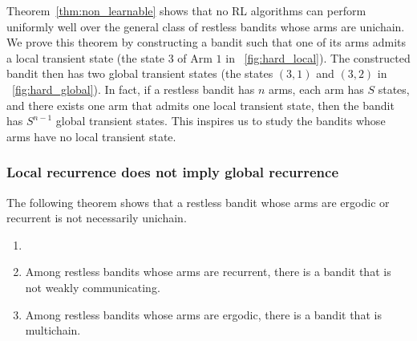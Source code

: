 Theorem~\ref{thm:non_learnable} shows that no RL algorithms can perform uniformly well over the general class of restless bandits whose arms are unichain. %
We prove this theorem by constructing a bandit such that one of its arms admits a local transient state (the state $3$ of Arm $1$ in \figurename~\ref{fig:hard_local}).
The constructed bandit then has two global transient states (the states $(3,1)$ and $(3,2)$ in \figurename~\ref{fig:hard_global}).
In fact, if a restless bandit has $n$ arms, each arm has $S$ states, and there exists one arm that admits one local transient state, then the bandit has $S^{n-1}$ global transient states.
This inspires us to study the bandits whose arms have no local transient state.

\subsubsection{Local recurrence does not imply global recurrence}

The following theorem shows that a restless bandit whose arms are ergodic or recurrent is not necessarily unichain.

\begin{thm}
    \label{thm:multichain}
    \begin{enumerate}[label=(\roman*)]
        \item[]
        \item \label{thm:not_ergodic} Among restless bandits whose arms are recurrent, there is a bandit that is not weakly communicating. %
        \item \label{thm:ergodic_arms_multichain_RB} Among restless bandits whose arms are ergodic, there is a bandit that is multichain.
    \end{enumerate}
\end{thm}

